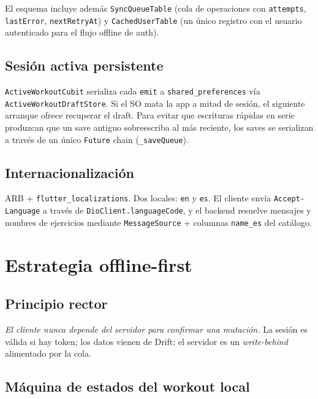 \documentclass[11pt,a4paper]{article}
\newcommand{\cls}[1]{\texttt{\small #1}}
\begin{document}
El esquema incluye además \texttt{SyncQueueTable} (cola de operaciones con \texttt{attempts}, \texttt{lastError}, \texttt{nextRetryAt}) y \texttt{CachedUserTable} (un único registro con el usuario autenticado para el flujo offline de auth).

\subsection{Sesión activa persistente}

\cls{ActiveWorkoutCubit} serializa cada \texttt{emit} a \texttt{shared\_preferences} vía \cls{ActiveWorkoutDraftStore}. Si el SO mata la app a mitad de sesión, el siguiente arranque ofrece recuperar el draft. Para evitar que escrituras rápidas en serie produzcan que un save antiguo sobreescriba al más reciente, los saves se serializan a través de un único \texttt{Future} chain (\texttt{\_saveQueue}).

\subsection{Internacionalización}

ARB + \texttt{flutter\_localizations}. Dos locales: \texttt{en} y \texttt{es}. El cliente envía \texttt{Accept-Language} a través de \cls{DioClient.languageCode}, y el backend resuelve mensajes y nombres de ejercicios mediante \texttt{MessageSource} + columnas \texttt{name\_es} del catálogo.

\section{Estrategia offline-first}

\subsection{Principio rector}

\textit{El cliente nunca depende del servidor para confirmar una mutación.} La sesión es válida si hay token; los datos vienen de Drift; el servidor es un \textit{write-behind} alimentado por la cola.

\subsection{Máquina de estados del workout local}
\end{document}
